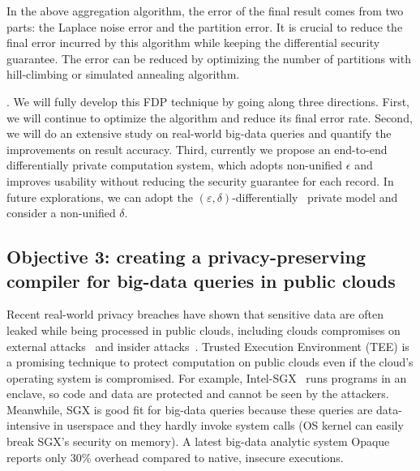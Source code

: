 In the above aggregation algorithm, the error of the final result comes from 
two parts: the Laplace noise error and the partition error. It is crucial to 
reduce the final error incurred by this algorithm while keeping the 
differential security guarantee. The error can be reduced by optimizing
the number of partitions with hill-climbing or simulated annealing algorithm.

. We will fully develop this FDP technique by going 
along three directions. First, we will continue to optimize the algorithm and 
reduce its final error rate. Second, we will do an extensive study on 
real-world big-data queries and quantify the improvements on result accuracy. 
Third, currently we propose an end-to-end differentially private computation
system, which adopts non-unified $\epsilon$  
and improves usability without reducing the security 
guarantee for each record. In future explorations, we can adopt the 
$(\varepsilon, \delta)$-differentially~\cite{differntialprivacy:tcc06}
private model and consider a non-unified $\delta$.


\vspace{-.15in}\subsection{Objective 3: creating a privacy-preserving compiler 
for big-data queries in public clouds}\label{sec:obj3}\vspace{-.075in}


Recent real-world privacy breaches have shown that sensitive data are often 
leaked while being processed in public clouds, including clouds 
compromises on external attacks~\cite{icloud-breach} and 
insider attacks~\cite{top-threats}. Trusted Execution Environment 
(TEE) is a promising technique to protect computation on public clouds even if 
the cloud's operating system is compromised. For example, 
Intel-SGX~\cite{intel-sgx} runs programs in an enclave, so code and data are 
protected and cannot be seen by the attackers. Meanwhile, SGX is good fit for 
big-data queries because these queries are data-intensive in userspace and they 
hardly invoke system calls (OS kernel can easily break SGX's security on 
memory). A latest big-data analytic system Opaque~\cite{opaque:nsdi17} reports 
only 30\% overhead compared to native, insecure executions.

